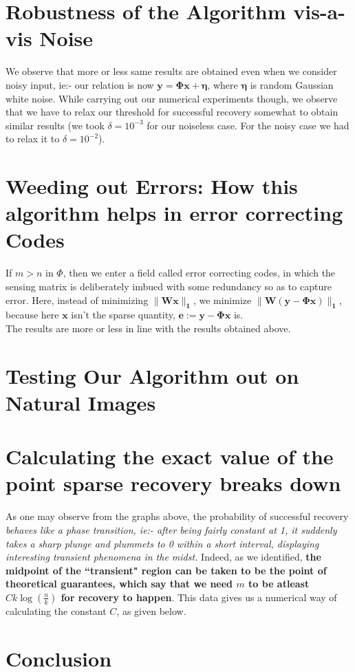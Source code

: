 \documentclass[a4paper,14pt]{article}
\numberwithin{definition}{section}
\numberwithin{mytheorem}{subsection}
\begin{document}
\section{Robustness of the Algorithm vis-a-vis Noise}
We observe that more or less same results are obtained even when we consider noisy input, ie:- our relation is now $\boldsymbol{y = \Phi x + \eta}$, where $\boldsymbol{\eta}$ is random Gaussian white noise. While carrying out our numerical experiments though, we observe that we have to relax our threshold for successful recovery somewhat to obtain similar results (we took $\delta = 10^{-3}$ for our noiseless case. For the noisy case we had to relax it to $\delta = 10^{-2}$).
\section{Weeding out Errors: How this algorithm helps in error correcting Codes}
If $m > n$ in $\Phi$, then we enter a field called error correcting codes, in which the sensing matrix is deliberately imbued with some redundancy so as to capture error. Here, instead of minimizing $\boldsymbol{\lVert Wx\rVert_1}$, we minimize $\boldsymbol{\lVert W(y - \Phi x)\rVert_1}$, because here $\boldsymbol{x}$ isn't the sparse quantity, $\boldsymbol{e := y -\Phi x}$ is.\\
The results are more or less in line with the results obtained above.
\section{Testing Our Algorithm out on Natural Images}
\section{Calculating the exact value of the point sparse recovery breaks down}
As one may observe from the graphs above, the probability of successful recovery \emph{behaves like a phase transition, ie:- after being fairly constant at 1, it suddenly takes a sharp plunge and plummets to 0 within a short interval, displaying interesting transient phenomena in the midst.} Indeed, as we identified, \textbf{the midpoint of the ``transient" region can be taken to be the point of theoretical guarantees, which say that we need $m$ to be atleast $Ck\log (\frac{n}{k})$ for recovery to happen}. This data gives us a numerical way of calculating the constant $C$, as given below.
\section{Conclusion}
\end{document}
